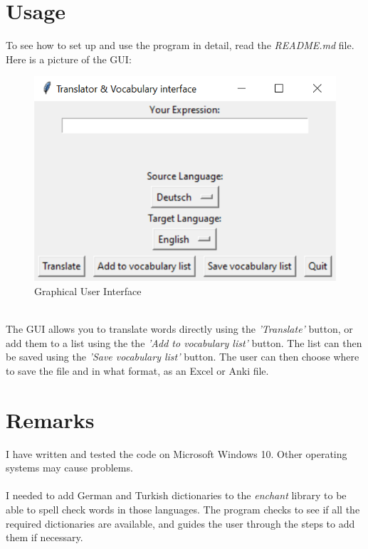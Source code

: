 \documentclass[11pt,a4paper,leqno]{article}
\begin{document}
    \section{Usage}
    To see how to set up and use the program in detail, read the \emph{README.md} file.\\
    Here is a picture of the GUI:\@
    \begin{figure}[h]
        \caption{Graphical User Interface}
        \includegraphics{GUI_screenshot}
    \end{figure}\\  
    The GUI allows you to translate words directly using the \emph{'Translate'} button, or add them to a list using the the \emph{'Add to vocabulary list'} button.
    The list can then be saved using the \emph{'Save vocabulary list'} button.
    The user can then choose where to save the file and in what format, as an Excel or Anki file.
    
    \newpage
    
    \section{Remarks}
    
    I have written and tested the code on Microsoft Windows 10. Other operating systems may cause problems.\\\\
    I needed to add German and Turkish dictionaries to the \emph{enchant} library to be able to spell check words in those languages.
    The program checks to see if all the required dictionaries are available, and guides the user through the steps to add them if necessary.
\end{document}
